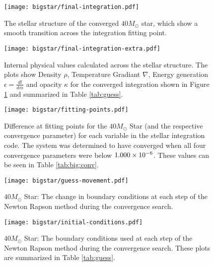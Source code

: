 \documentclass[10pt]{article}
\begin{document}
 \begin{figure}[htbp]
    \centering
    \texttt{[image: bigstar/final-integration.pdf]}
    \caption[$40 M_\odot$ Star: Converged Integration]{The stellar structure of the converged $40 M_\odot$ star, which show a smooth transition across the integration fitting point.}
    \label{fig:big:finalint}
 \end{figure}
 

 \begin{figure}[htbp]
    \centering
    \texttt{[image: bigstar/final-integration-extra.pdf]}
    \caption[$40 M_\odot$ Star: Properties of the Converged Integration]{Internal physical values calculated across the stellar structure. The plots show Density $\rho$, Temperature Gradiant $\nabla$, Energy generation $\epsilon = \frac{dl}{dm}$ and opacity $\kappa$ for the converged integration shown in Figure \ref{fig:big:finalint} and summarized in Table \ref{tab:guess}. }
    \label{fig:big:finalintextra}
 \end{figure}


\begin{table}[htbp]
\begin{center}
\label{tab:big:conv}

 \end{center}
 \end{table}
 
 \begin{figure}[htbp]
    \centering
    \texttt{[image: bigstar/fitting-points.pdf]}
    \caption[$40 M_\odot$ Star: Gaps at Fitting Points]{Difference at fitting points for the $40 M_\odot$ Star (and the respective convergence parameter) for each variable in the stellar integration code. The system was determined to have converged when all four convergence parameters were below $1.000 \times 10^{-6}$. These values can be seen in Table \ref{tab:big:conv}.}
    \label{fig:big:conv}
 \end{figure}
 
  \begin{figure}[htbp]
    \centering
    \texttt{[image: bigstar/guess-movement.pdf]}
    \caption[$40 M_\odot$ Star: Boundary Point Movement]{$40 M_\odot$ Star: The change in boundary conditions at each step of the Newton Rapson method during the convergence search.}
    \label{fig:big:boundarydelta}
 \end{figure}
 \begin{figure}[htbp]
    \centering
    \texttt{[image: bigstar/initial-conditions.pdf]}
    \caption[$40 M_\odot$ Star: Boundary Points]{$40 M_\odot$ Star: The boundary conditions used at each step of the Newton Rapson method during the convergence search. These plots are summarized in Table \ref{tab:guess}.}
    \label{fig:big:boundary}
 \end{figure}    
\end{document}
